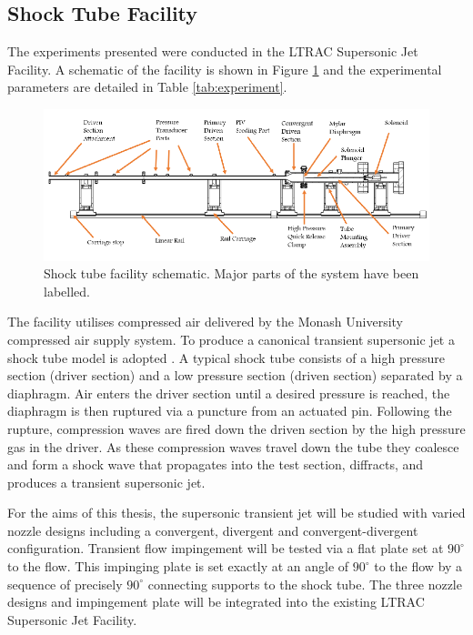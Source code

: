 \subsection{Shock Tube Facility}
The experiments presented were conducted in the LTRAC Supersonic Jet Facility. A schematic of the facility is shown in Figure \ref{fig:shocktube} and the experimental parameters are detailed in Table \ref{tab:experiment}. 

\begin{figure}[H] 
	\centering
	\includegraphics[width=1\textwidth]{fig9.PNG} 
	\caption{Shock tube facility schematic. Major parts of the
		system have been labelled.}
	\label{fig:shocktube}
\end{figure}	

The facility utilises compressed air delivered by the Monash University compressed air supply system. To produce a canonical transient supersonic jet a shock tube model is adopted \citep{john1962shock}. A typical shock tube consists of a high pressure section (driver section) and a low pressure section (driven section) separated by a diaphragm. Air enters the driver section until a desired pressure is reached, the diaphragm is then ruptured via a puncture from an actuated pin. Following the rupture, compression waves are fired down the driven section by the high pressure gas in the driver. As these compression waves travel down the tube they coalesce and form a shock wave that propagates into the test section, diffracts, and produces a transient supersonic jet. 

For the aims of this thesis, the supersonic transient jet will be studied with varied nozzle designs including a convergent, divergent and convergent-divergent configuration. Transient flow impingement will be tested via a flat plate set at $90^\circ$ to the flow. This impinging plate is set exactly at an angle of $90^\circ$ to the flow by a sequence of precisely $90^\circ$ connecting supports to the shock tube. The three nozzle designs and impingement plate will be integrated into the existing LTRAC Supersonic Jet Facility.

